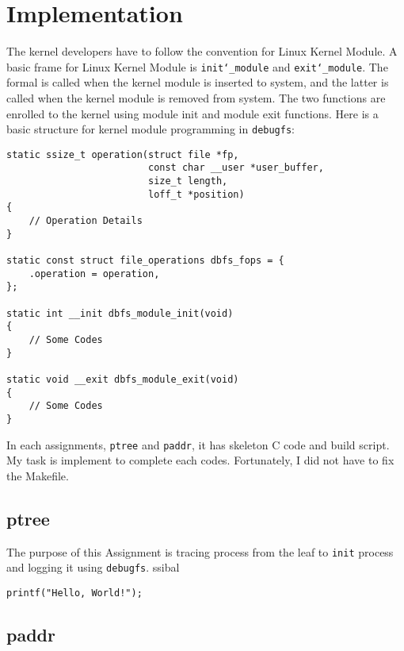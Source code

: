 \chapter{Implementation}


The kernel developers have to follow the convention for Linux Kernel Module.
A basic frame for Linux Kernel Module is \texttt{init\char`_module} and \texttt{exit\char`_module}.
The formal is called when the kernel module is inserted to system, and the latter is called when the kernel module is removed from system.
The two functions are enrolled to the kernel using module init and module exit functions.
Here is a basic structure for kernel module programming in \texttt{debugfs}:

\begin{lstlisting}
static ssize_t operation(struct file *fp, 
                         const char __user *user_buffer, 
                         size_t length, 
                         loff_t *position)
{
    // Operation Details
}

static const struct file_operations dbfs_fops = {
    .operation = operation,
};

static int __init dbfs_module_init(void)
{
    // Some Codes
}

static void __exit dbfs_module_exit(void)
{
    // Some Codes
}
\end{lstlisting}

In each assignments, \texttt{ptree} and \texttt{paddr}, it has skeleton C code and build script.
My task is implement to complete each codes.
Fortunately, I did not have to fix the Makefile.

\section{ptree}
The purpose of this Assignment is tracing process from the leaf to \texttt{init} process and logging it using \texttt{debugfs}.
ssibal

\begin{lstlisting}
printf("Hello, World!");
\end{lstlisting}

\section{paddr}
